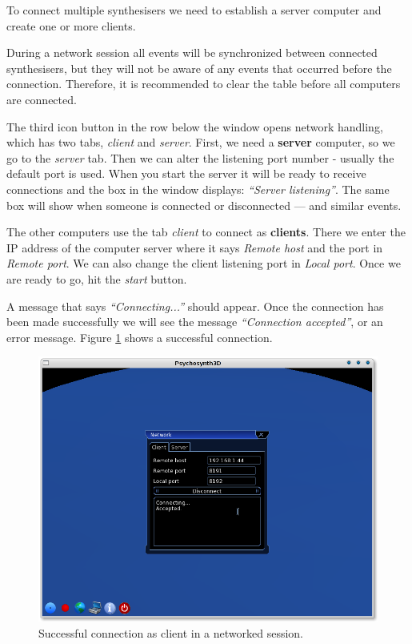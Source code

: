 To connect multiple synthesisers we need to establish a server
computer and create one or more clients.

During a network session all events will be synchronized between
connected synthesisers, but they will not be aware of any events that
occurred before the connection. Therefore, it is recommended to clear
the table before all computers are connected.

The third icon button in the row below the window opens network
handling, which has two tabs, \emph{client} and \emph{server}. First,
we need a \textbf{server} computer, so we go to the \emph{server}
tab. Then we can alter the listening port number - usually the default
port is used. When you start the server it will be ready to receive
connections and the box in the window displays: \emph{``Server
listening''}. The same box will show when someone is connected or
disconnected --- and similar events.

The other computers use the tab \emph{client} to connect as
\textbf{clients}. There we enter the IP address of the computer server
where it says \emph{Remote host} and the port in \emph{Remote
  port}. We can also change the client listening port in \emph{Local
port}. Once we are ready to go, hit the \emph{start} button.

A message that says \emph{``Connecting...''} should appear. Once the
connection has been made successfully we will see the message
\emph{``Connection accepted''}, or an error message. Figure
\ref{fig:userman-4} shows a successful connection.

\begin{figure}[h!]
  \centering
  \includegraphics[width=.7\textwidth]{pic/userman-4.png}
  \caption{Successful connection as client in a networked session.}
  \label{fig:userman-4}
\end{figure}


